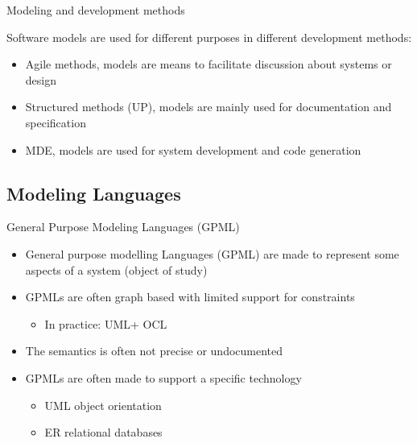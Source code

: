 \documentclass[slidetop,mathserif,red]{beamer}
\begin{document}
\begin{frame}{Modeling and development methods}

    Software models are used for different purposes in different development methods:
        \begin{itemize}
        \item Agile methods, models are means to facilitate discussion about systems or design
        \item Structured methods (UP), models are mainly used for documentation and specification
        \item MDE, models are used for system development and code generation
        \end{itemize}
\end{frame}





\subsection{Modeling Languages}

\begin{frame}{General Purpose Modeling Languages (GPML)}

    \begin{itemize}
    \item General purpose modelling Languages (GPML) are made to represent some aspects of a system (object of study)

    \item GPMLs are often graph based with limited support for constraints
        \begin{itemize}
        \item In practice: UML+ OCL
        \end{itemize}
    \item The semantics is often not precise or undocumented
    \item GPMLs are often made to support a specific technology
        \begin{itemize}
        \item UML object orientation
        \item ER relational databases
        \end{itemize}
    \end{itemize}
\end{frame}
\end{document}
